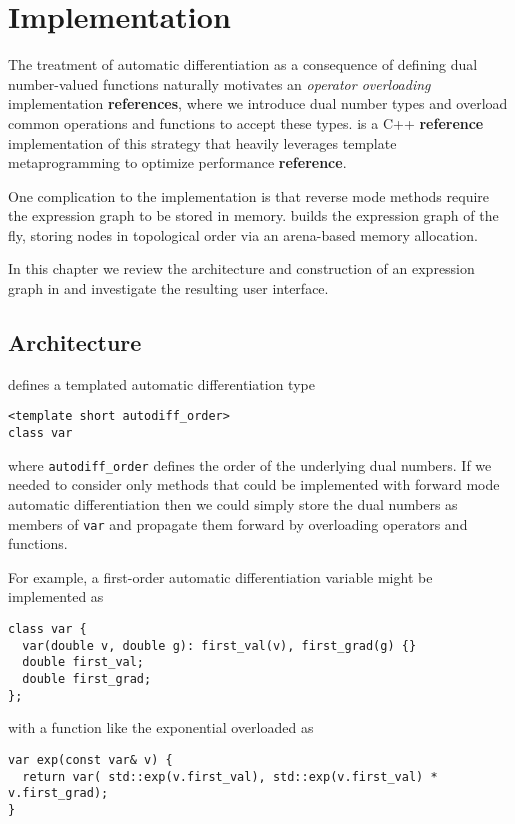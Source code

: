 \chapter{Implementation}

The treatment of automatic differentiation as a consequence of
defining dual number-valued functions naturally motivates an
\textit{operator overloading} implementation \textbf{references},
where we introduce dual number types and overload common
operations and functions to accept these types.  \nomad is a C++
\textbf{reference} implementation of this strategy that heavily 
leverages template metaprogramming to optimize performance 
\textbf{reference}.

One complication to the implementation is that reverse mode
methods require the expression graph to be stored in memory.
\nomad builds the expression graph of the fly, storing nodes
in topological order via an arena-based memory allocation.

In this chapter we review the architecture and construction of
an expression graph in \nomad and investigate the resulting
user interface.

\section{Architecture} \label{sec:architecture}

\nomad defines a templated automatic differentiation type
%
\begin{verbatim}
<template short autodiff_order>
class var
\end{verbatim}
%
where \verb|autodiff_order| defines the order of the underlying
dual numbers.  If we needed to consider only methods that
could be implemented with forward mode automatic differentiation
then we could simply store the dual numbers as members of
\verb|var| and propagate them forward by overloading operators
and functions.

For example, a first-order automatic differentiation variable
might be implemented as
%
\begin{verbatim}
class var {
  var(double v, double g): first_val(v), first_grad(g) {}
  double first_val;
  double first_grad;
};
\end{verbatim}
%
with a function like the exponential overloaded as
%
\begin{verbatim}
var exp(const var& v) {
  return var( std::exp(v.first_val), std::exp(v.first_val) * v.first_grad);
}
\end{verbatim}

